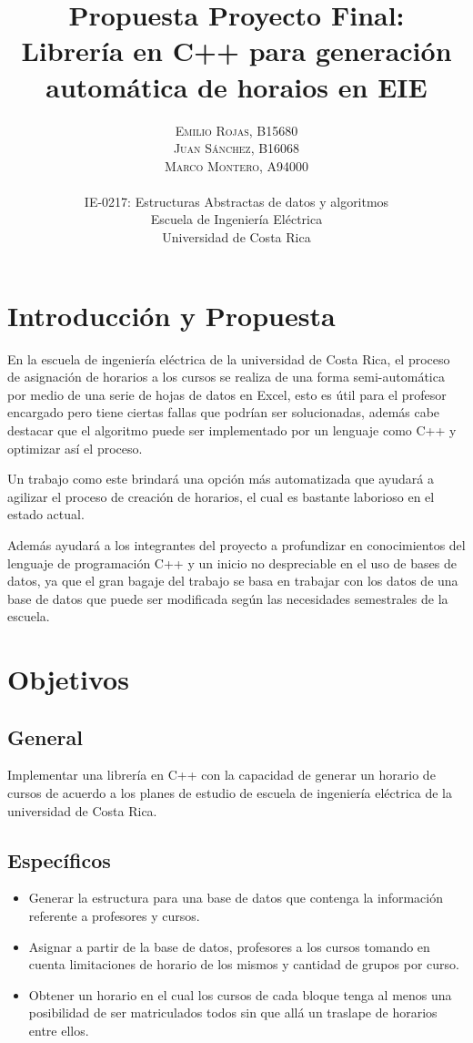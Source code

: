 \documentclass[paper=letter, fontsize=12pt]{article}
\title{
\vspace{-15mm}\fontsize{24pt}{10pt}\selectfont\textbf{
Propuesta Proyecto Final:\\
Librería en C++ para generación automática de horaios en EIE}} %
\author{
\large
{\textsc{Emilio Rojas, B15680}}\\[2mm]
{\textsc{Juan Sánchez, B16068}}\\[2mm]
{\textsc{Marco Montero, A94000}}\\[2mm]
{\textsc{}}\\[2mm]
\normalsize IE-0217: Estructuras Abstractas de datos y algoritmos\\[1mm]
\normalsize Escuela de Ingeniería Eléctrica \\ %
\normalsize Universidad de Costa Rica \\ %
\vspace{-5mm}
}
\date{}
\begin{document}
\maketitle %
\thispagestyle{fancy} %

\section{Introducción y Propuesta}
En la escuela de ingeniería eléctrica de la universidad de Costa Rica, el
proceso de asignación de horarios a los cursos se realiza de una forma
semi-automática por medio de una serie de hojas de datos en Excel, esto es útil
para el profesor encargado pero tiene ciertas fallas que podrían ser
solucionadas, además cabe destacar que el algoritmo puede ser implementado por
un lenguaje como C++ y optimizar así el proceso.

Un trabajo como este brindará una opción más automatizada que ayudará a agilizar
el proceso de creación de horarios, el cual es bastante laborioso en el estado
actual.

Además ayudará a los integrantes del proyecto a profundizar en conocimientos del
lenguaje de programación C++ y un inicio no despreciable en el uso de bases de
datos, ya que el gran bagaje del trabajo se basa en trabajar con los datos de
una base de datos que puede ser modificada según las necesidades semestrales de
la escuela.


\section{Objetivos}

\subsection{General}
Implementar una librería en C++ con la capacidad de generar un horario de cursos
de acuerdo a los planes de estudio de escuela de ingeniería eléctrica de la
universidad de Costa Rica.

\subsection{Específicos}
\begin{itemize}
	\item Generar la estructura para una base de datos que contenga la
    información referente a profesores y cursos.
	\item Asignar a partir de la base de datos, profesores a los cursos tomando
    en cuenta limitaciones de horario de los mismos y cantidad de grupos por
    curso.
	\item Obtener un horario en el cual los cursos de cada bloque tenga al
    menos una posibilidad de ser matriculados todos sin que allá un traslape de
    horarios entre ellos.
\end{itemize}
\end{document}
